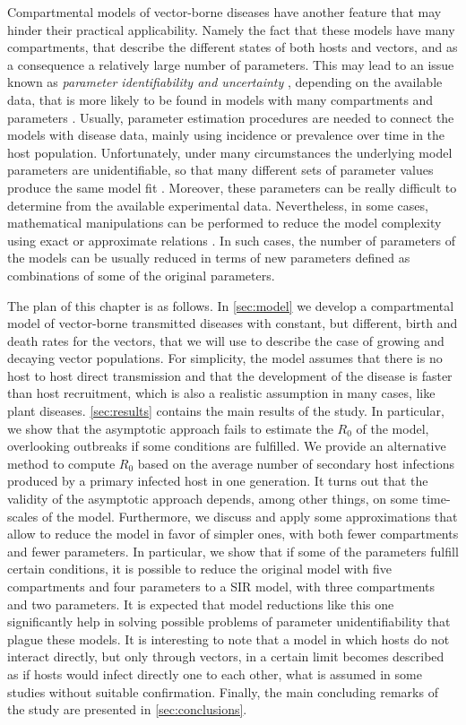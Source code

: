 Compartmental models of vector-borne diseases have another feature that may
hinder their practical applicability. Namely the fact that these models have
many compartments, that describe the different states of both hosts and
vectors, and as a consequence a relatively large number of parameters. This may
lead to an issue known as \textit{parameter identifiability and uncertainty}
\cite{Chowel2017}, depending on the available data, that is more likely to be
found in models with many compartments and parameters \cite{Roosa2019}.
Usually, parameter estimation procedures are needed to connect the models with
disease data, mainly using incidence or prevalence over time in the host
population. Unfortunately, under many circumstances the underlying model
parameters are unidentifiable, so that many different sets of parameter values
produce the same model fit \cite{Kao2018}. Moreover, these parameters can be
really difficult to determine from the available experimental data.
Nevertheless, in some cases, mathematical manipulations can be performed to
reduce the model complexity using exact or approximate relations
\cite{GimenezRomero2021}. In such cases, the number of parameters of the models
can be usually reduced in terms of new parameters defined as combinations of
some of the original parameters.

The plan of this chapter is as follows. In \cref{sec:model} we develop a
compartmental model of vector-borne transmitted diseases with constant, but
different, birth and death rates for the vectors, that we will use to describe
the case of growing and decaying vector populations. For simplicity, the model
assumes that there is no host to host direct transmission and that the
development of the disease is faster than host recruitment, which is also a
realistic assumption in  many cases, like plant diseases. \cref{sec:results}
contains the main results of the study. In particular, we show that the
asymptotic approach fails to estimate the $R_0$ of the model, overlooking
outbreaks if some conditions are fulfilled. We provide an alternative
method to compute $R_0$ based on the average number of secondary host
infections produced by a primary infected host in one generation. It turns out
that the validity of the asymptotic approach depends, among other things, on
some time-scales of the model. Furthermore, we discuss and apply some
approximations that allow to reduce the model in favor of simpler ones, with
both fewer compartments and fewer parameters. In particular, we show that if
some of the parameters fulfill certain conditions, it is possible to reduce the
original model with five compartments and four parameters to a SIR model, with
three compartments and two parameters. It is expected that model reductions
like this one significantly help in solving possible problems of parameter
unidentifiability that plague these models. It is interesting to note that a
model in which hosts do not interact directly, but only through vectors, in a
certain limit becomes described as if hosts would infect directly one to each
other, what is assumed in some studies without suitable confirmation. Finally,
the main concluding remarks of the study are presented in
\cref{sec:conclusions}.

